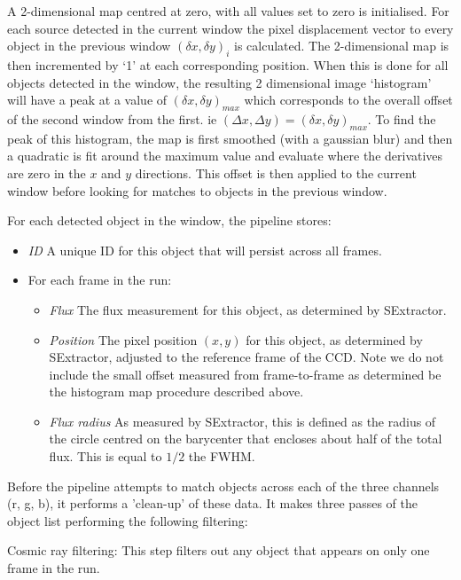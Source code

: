 A 2-dimensional map centred at zero, with all values set to zero is initialised. For each source detected in the current window the pixel displacement vector to every object in the previous window $(\delta x, \delta y)_i$ is calculated.  The 2-dimensional map is then incremented by `1' at each corresponding position. When this is done for all objects detected in the window, the resulting 2 dimensional image `histogram' will have a peak at a value of $(\delta x, \delta y)_{max}$ which corresponds to the overall offset of the second window from the first. ie $(\Delta x, \Delta y) = (\delta x, \delta y)_{max}$. To find the peak of this histogram, the map is first smoothed (with a gaussian blur) and then a quadratic is fit around the maximum value and evaluate where the derivatives are zero in the $x$ and $y$ directions. This offset is then applied to the current window before looking for matches to objects in the previous window.

For each detected object in the window, the pipeline stores: 
\begin{itemize}
  \item \emph{ID} A unique ID for this object that will persist across all frames.
  \item For each frame in the run:
  \begin{itemize}
    \item \emph{Flux} The flux measurement for this object, as determined by SExtractor.
    \item \emph{Position} The pixel position $(x, y)$ for this object, as determined by SExtractor, adjusted to the reference frame of the CCD. Note we do not include the small offset measured from frame-to-frame as determined be the histogram map procedure described above. 
    \item \emph{Flux radius} As measured by SExtractor, this is defined as the radius of the circle centred on the barycenter that encloses about half of the total flux. This is equal to $1/2$ the FWHM. 
  \end{itemize}
\end{itemize}

\label{sect:filtering}
Before the pipeline attempts to match objects across each of the three channels (r, g, b), it performs a 'clean-up' of these data. It makes three passes of the object list performing the following filtering:

Cosmic ray filtering: This step filters out any object that appears on only one frame in the run. 

